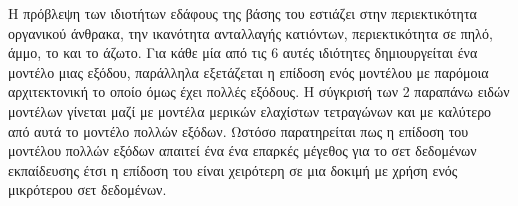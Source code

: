 Η πρόβλεψη των ιδιοτήτων εδάφους της βάσης του  εστιάζει στην περιεκτικότητα οργανικού άνθρακα, την ικανότητα ανταλλαγής κατιόντων, περιεκτικότητα σε πηλό, άμμο, το  και το άζωτο. Για κάθε μία από τις 6 αυτές ιδιότητες δημιουργείται ένα μοντέλο μιας εξόδου, παράλληλα εξετάζεται η επίδοση ενός μοντέλου με παρόμοια αρχιτεκτονική το οποίο όμως έχει πολλές εξόδους. Η σύγκρισή των 2 παραπάνω ειδών μοντέλων γίνεται μαζί με μοντέλα μερικών ελαχίστων τετραγώνων και  με καλύτερο από αυτά το μοντέλο πολλών εξόδων. Ωστόσο παρατηρείται πως η επίδοση του μοντέλου πολλών εξόδων απαιτεί ένα ένα επαρκές μέγεθος για το σετ δεδομένων εκπαίδευσης έτσι η επίδοση του είναι χειρότερη σε μια δοκιμή με χρήση ενός μικρότερου σετ δεδομένων.
